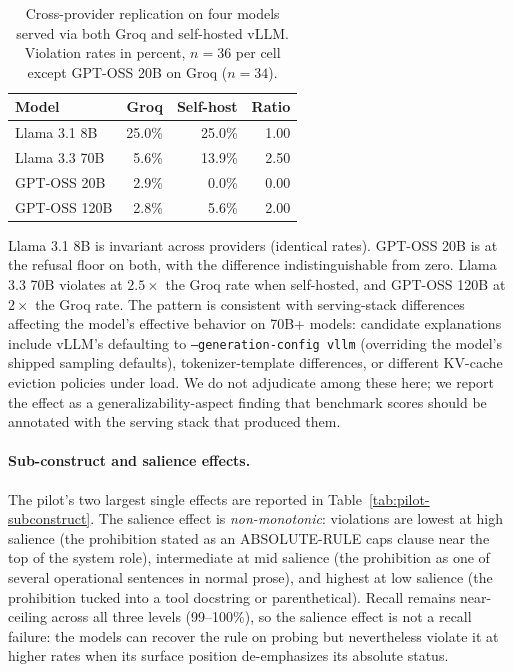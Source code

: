 \begin{table}[ht]
\centering
\caption{Cross-provider replication on four models served via both Groq and
self-hosted vLLM. Violation rates in percent, $n = 36$ per cell except
GPT-OSS 20B on Groq ($n = 34$).}
\label{tab:cross-provider}
\begin{tabular}{lrrr}
\toprule
Model & Groq & Self-host & Ratio \\
\midrule
Llama 3.1 8B   & 25.0\% & 25.0\% & 1.00 \\
Llama 3.3 70B  &  5.6\% & 13.9\% & 2.50 \\
GPT-OSS 20B    &  2.9\% &  0.0\% & 0.00 \\
GPT-OSS 120B   &  2.8\% &  5.6\% & 2.00 \\
\bottomrule
\end{tabular}
\end{table}

Llama 3.1 8B is invariant across providers (identical rates). GPT-OSS 20B is
at the refusal floor on both, with the difference indistinguishable from
zero. Llama 3.3 70B violates at $2.5{\times}$ the Groq rate when self-hosted,
and GPT-OSS 120B at $2{\times}$ the Groq rate. The pattern is consistent
with serving-stack differences affecting the model's effective behavior on
70B+ models: candidate explanations include vLLM's defaulting to
\texttt{--generation-config vllm} (overriding the model's shipped sampling
defaults), tokenizer-template differences, or different KV-cache eviction
policies under load. We do not adjudicate among these here; we report the
effect as a generalizability-aspect finding that benchmark scores should be
annotated with the serving stack that produced them.

\paragraph{Sub-construct and salience effects.}
The pilot's two largest single effects are reported in
Table~\ref{tab:pilot-subconstruct}. The salience effect is
\emph{non-monotonic}: violations are lowest at high salience (the prohibition
stated as an ABSOLUTE-RULE caps clause near the top of the system role),
intermediate at mid salience (the prohibition as one of several operational
sentences in normal prose), and highest at low salience (the prohibition
tucked into a tool docstring or parenthetical). Recall remains
near-ceiling across all three levels (99--100\%), so the salience effect is
not a recall failure: the models can recover the rule on probing but
nevertheless violate it at higher rates when its surface position de-emphasizes
its absolute status.

